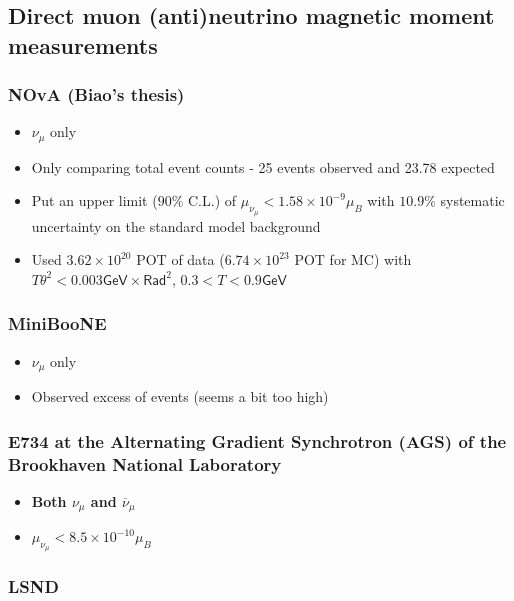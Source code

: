 \subsection{Direct muon (anti)neutrino magnetic moment measurements}
\subsubsection{NOvA (Biao's thesis)}
\begin{itemize}
    \item $\nu_\mu$ only
    \item Only comparing total event counts - 25 events observed and 23.78 expected
    \item Put an upper limit ($90\%$ C.L.) of $\mu_{\nu_\mu}<1.58\times 10^{-9}\mu_B$ with $10.9\%$ systematic uncertainty on the standard model background
    \item Used $3.62\times 10^{20}$ POT of data ($6.74\times 10^{23}$ POT for MC) with $T\theta^2<0.003\textsf{GeV}\times\textsf{Rad}^2$, $0.3<T<0.9\textsf{GeV}$
\end{itemize}

\subsubsection{MiniBooNE}
\begin{itemize}
    \item $\nu_\mu$ only
    \item Observed excess of events (seems a bit too high)
\end{itemize}

\subsubsection{E734 at the Alternating Gradient Synchrotron (AGS) of the Brookhaven National Laboratory}
\begin{itemize}
    \item \textbf{Both $\nu_\mu$ and $\overline{\nu}_\mu$}
    \item $\mu_{\nu_\mu}<8.5\times 10^{-10}\mu_B$
\end{itemize}

\subsubsection{LSND}

